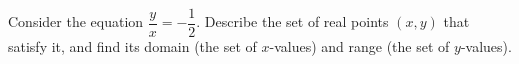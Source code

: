 Consider the equation $\dfrac yx=-\dfrac12$. Describe the set of real points $(x,y)$ that satisfy it, and find its domain (the set of $x$-values) and range (the set of $y$-values).
